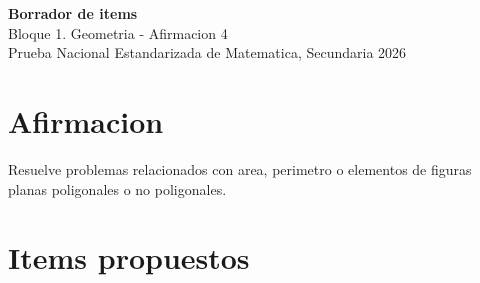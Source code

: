 \documentclass[12pt]{article}
\begin{document}
\begin{center}
  {\Large \textbf{Borrador de items}}\\
  {\large Bloque 1. Geometria - Afirmacion 4}\\[4pt]
  Prueba Nacional Estandarizada de Matematica, Secundaria 2026
\end{center}

\section*{Afirmacion}
Resuelve problemas relacionados con area, perimetro o elementos de figuras planas poligonales o no poligonales.

\section*{Items propuestos}
\end{document}
